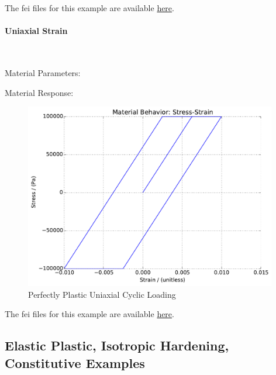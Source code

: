\documentclass[fleqn,11pt]{article}
\begin{document}
The fei files for this example are available \href{https://github.com/yuan-energy/education_examples/tree/master/fei_examples/perfectly_plastic/2pure_shear_cyclic_loading}{here}.

\newpage
\paragraph{Uniaxial Strain} ~

Material Parameters:


Material Response:
\begin{figure}[H]
\begin{center}
\includegraphics[width=11cm]{../fei_examples/perfectly_plastic/4uniaxial_strain_cyclic_loading/result.pdf}
\caption{
\label{Perfectly Plastic Uniaxial Cyclic Loading}
Perfectly Plastic Uniaxial Cyclic Loading}
\end{center}
\end{figure}

The fei files for this example are available \href{https://github.com/yuan-energy/education_examples/tree/master/fei_examples/perfectly_plastic/4uniaxial_strain_cyclic_loading}{here}.


\newpage
\subsection{Elastic Plastic, Isotropic Hardening, Constitutive Examples}
\end{document}
